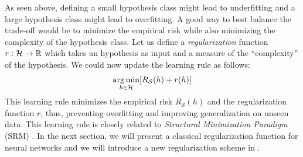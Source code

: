 As seen above, defining a small hypothesis class might lead to underfitting and a large hypothesis class might lead to overfitting.
A good way to best balance the trade-off would be to minimize the empirical risk while also minimizing the complexity of the hypothesis class. 
Let us define a \emph{regularization} function $r: \mathcal{H} \rightarrow \mathbb{R}$ which takes an hypothesis as input and a measure of the ``complexity'' of the hypothesis.
We could now update the learning rule as follows:
\begin{equation}
  \argmin_{h \in \mathcal{H}} \left[ R_\mathcal{S}(h) + r(h) \right]
\end{equation}
This learning rule minimizes the empirical risk $R_\mathcal{S}(h)$ and the regularization function $r$, thus, preventing overfitting and improving generalization on unseen data.
This learning rule is closely related to \emph{Structural Minimization Paradigm} (SRM) \cite{shalev2014understanding}.
In the next section, we will present a classical regularization function for neural networks and we will introduce a new regularization scheme in .













